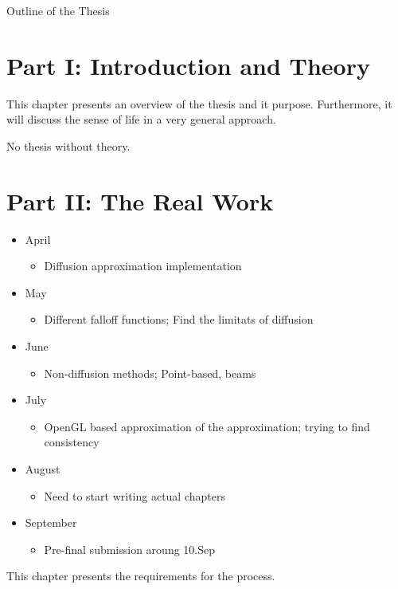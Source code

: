 \newpage

{}

\begin{center}
	\huge{Outline of the Thesis}
\end{center}




\section*{Part I: Introduction and Theory}


\noindent  This chapter presents an overview of the thesis and it purpose. Furthermore, it will discuss the sense of life in a very general approach.


\noindent  No thesis without theory.

\section*{Part II: The Real Work}

\begin{itemize}
    \item{April}
        \begin{itemize}
          \item{Diffusion approximation implementation}
        \end{itemize}
    \item{May}
        \begin{itemize}
          \item{Different falloff functions; Find the limitats of diffusion}
        \end{itemize}
    \item{June}
        \begin{itemize}
          \item{Non-diffusion methods; Point-based, beams}
        \end{itemize}
    \item{July}
        \begin{itemize}
          \item{OpenGL based approximation of the approximation; trying to find
          consistency}
        \end{itemize}
    \item{August}
        \begin{itemize}
          \item{Need to start writing actual chapters}
        \end{itemize}
    \item{September}
        \begin{itemize}
          \item{Pre-final submission aroung 10.Sep}
        \end{itemize}
\end{itemize}

\noindent  This chapter presents the requirements for the process.